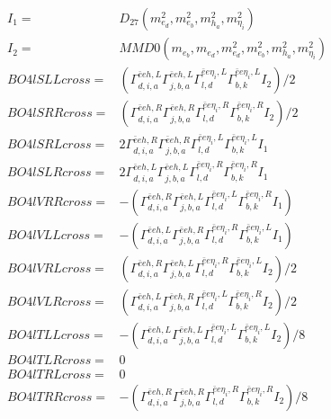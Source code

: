 \documentclass[A4,landscape]{article}
\begin{document}
\begin{align} 
I_1 = & D_{27}(m^2_{e_{{d}}}, m^2_{e_{{b}}}, m^2_{h_{{a}}}, m^2_{\eta_i}) \\ 
I_2 = & MMD0(m_{e_{{b}}}, m_{e_{{d}}}, m^2_{e_{{d}}}, m^2_{e_{{b}}}, m^2_{h_{{a}}}, m^2_{\eta_i}) \\ 
  BO4lSLLcross= & ( \Gamma^{\bar{e}e h ,L}_{d, i, a} \Gamma^{\bar{e}e h ,L}_{j, b, a} \Gamma^{\bar{e}e \eta_i ,L}_{l, d} \Gamma^{\bar{e}e \eta_i ,L}_{b, k} I_2)/2 \\ 
  BO4lSRRcross= & ( \Gamma^{\bar{e}e h ,R}_{d, i, a} \Gamma^{\bar{e}e h ,R}_{j, b, a} \Gamma^{\bar{e}e \eta_i ,R}_{l, d} \Gamma^{\bar{e}e \eta_i ,R}_{b, k} I_2)/2 \\ 
  BO4lSRLcross= & 2  \Gamma^{\bar{e}e h ,R}_{d, i, a} \Gamma^{\bar{e}e h ,R}_{j, b, a} \Gamma^{\bar{e}e \eta_i ,L}_{l, d} \Gamma^{\bar{e}e \eta_i ,L}_{b, k} I_1 \\ 
  BO4lSLRcross= & 2  \Gamma^{\bar{e}e h ,L}_{d, i, a} \Gamma^{\bar{e}e h ,L}_{j, b, a} \Gamma^{\bar{e}e \eta_i ,R}_{l, d} \Gamma^{\bar{e}e \eta_i ,R}_{b, k} I_1 \\ 
  BO4lVRRcross= & -( \Gamma^{\bar{e}e h ,R}_{d, i, a} \Gamma^{\bar{e}e h ,L}_{j, b, a} \Gamma^{\bar{e}e \eta_i ,L}_{l, d} \Gamma^{\bar{e}e \eta_i ,R}_{b, k} I_1) \\ 
  BO4lVLLcross= & -( \Gamma^{\bar{e}e h ,L}_{d, i, a} \Gamma^{\bar{e}e h ,R}_{j, b, a} \Gamma^{\bar{e}e \eta_i ,R}_{l, d} \Gamma^{\bar{e}e \eta_i ,L}_{b, k} I_1) \\ 
  BO4lVRLcross= & ( \Gamma^{\bar{e}e h ,R}_{d, i, a} \Gamma^{\bar{e}e h ,L}_{j, b, a} \Gamma^{\bar{e}e \eta_i ,R}_{l, d} \Gamma^{\bar{e}e \eta_i ,L}_{b, k} I_2)/2 \\ 
  BO4lVLRcross= & ( \Gamma^{\bar{e}e h ,L}_{d, i, a} \Gamma^{\bar{e}e h ,R}_{j, b, a} \Gamma^{\bar{e}e \eta_i ,L}_{l, d} \Gamma^{\bar{e}e \eta_i ,R}_{b, k} I_2)/2 \\ 
  BO4lTLLcross= & -( \Gamma^{\bar{e}e h ,L}_{d, i, a} \Gamma^{\bar{e}e h ,L}_{j, b, a} \Gamma^{\bar{e}e \eta_i ,L}_{l, d} \Gamma^{\bar{e}e \eta_i ,L}_{b, k} I_2)/8 \\ 
  BO4lTLRcross= & 0 \\ 
  BO4lTRLcross= & 0 \\ 
  BO4lTRRcross= & -( \Gamma^{\bar{e}e h ,R}_{d, i, a} \Gamma^{\bar{e}e h ,R}_{j, b, a} \Gamma^{\bar{e}e \eta_i ,R}_{l, d} \Gamma^{\bar{e}e \eta_i ,R}_{b, k} I_2)/8 \\ 
\end{align} 
\end{document}
